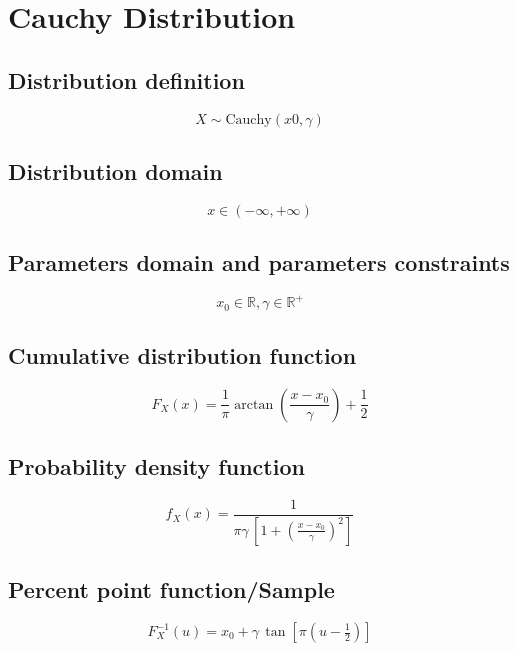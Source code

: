 \documentclass{article}
\begin{document}
\newpage
\section{Cauchy Distribution}
\subsection{Distribution definition}
\begin{equation*} X\sim\mathrm{Cauchy}\left(x0,\gamma\right) \end{equation*}
\subsection{Distribution domain}
\begin{equation*} x\in (-\infty,+\infty) \end{equation*}
\subsection{Parameters domain and parameters constraints}
\begin{equation*} x_0\in\mathbb{R}, \gamma\in\mathbb{R}^{+} \end{equation*}
\subsection{Cumulative distribution function}
\begin{equation*} F_{X}\left(x\right)=\frac{1}{\pi} \arctan\left(\frac{x-x_0}{\gamma}\right)+\frac{1}{2} \end{equation*}
\subsection{Probability density function}
\begin{equation*} f_{X}\left(x\right)=\frac{1}{\pi\gamma\,\left[1+\left(\frac{x-x_0}{\gamma}\right)^2\right]} \end{equation*}
\subsection{Percent point function/Sample}
\begin{equation*} F^{-1}_{X}\left(u\right)=x_0+\gamma\,\tan\left[\pi\left(u-\tfrac{1}{2}\right)\right] \end{equation*}
\subsection{Parametric centered moments}
\begin{equation*} \mu'_{k}=E[X^k]=\int_{-\infty }^{\infty }x^{k}f_{X}\left(x\right)dx \end{equation*}
\end{document}
